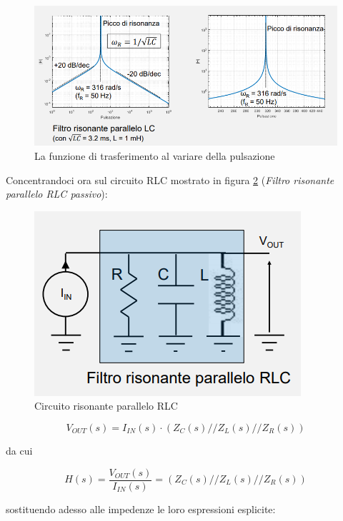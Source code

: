 \documentclass{article}
\begin{document}
\begin{figure}[h]
  \centering
  \includegraphics[scale=0.55]{IM_circuito_risonante_parallelo_LC_grafici}
  \caption{La funzione di trasferimento al variare della pulsazione}
  \label{Schema_circuito_risonante_parallelo_LC_grafici}
\end{figure}
\clearpage
Concentrandoci ora sul circuito RLC mostrato in figura \ref{Schema_circuito_risonante_parallelo_RLC} (\textit{Filtro risonante parallelo RLC passivo}):

\begin{figure}[h]
  \centering
  \includegraphics[scale=0.5]{IM_circuito_risonante_parallelo_RLC}
  \caption{Circuito risonante parallelo RLC}
  \label{Schema_circuito_risonante_parallelo_RLC}
\end{figure}

\[V_{OUT}(s) = I_{IN}(s) \cdot (Z_C(s) // Z_L (s) // Z_R (s))\]

da cui

\[H(s) = \frac{V_{OUT} (s)}{I_{IN} (s)} = (Z_C(s) // Z_L (s) // Z_R (s))\]

sostituendo adesso alle impedenze le loro espressioni esplicite:
\end{document}
